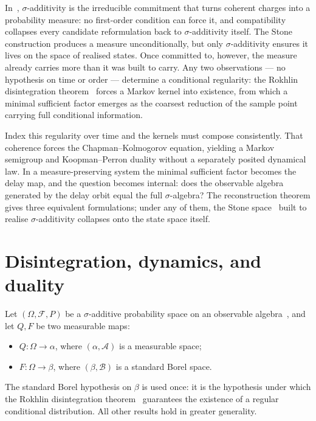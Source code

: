 In~\cite{mahon_paper1}, $\sigma$-additivity is the irreducible commitment
that turns coherent charges into a probability measure: no first-order
condition can force it, and compatibility collapses every candidate
reformulation back to $\sigma$-additivity itself.  The Stone construction
produces a measure unconditionally, but only $\sigma$-additivity ensures it
lives on the space of realised states.  Once committed to, however, the
measure already carries more than it was built to carry.  Any two
observations --- no hypothesis on time or order --- determine a
conditional regularity: the Rokhlin disintegration
theorem~\cite{Rokhlin1952} forces a Markov kernel into existence,
from which a minimal sufficient factor emerges as the coarsest
reduction of the sample point carrying full conditional information.

Index this regularity over time and the kernels must compose
consistently.  That coherence forces the Chapman--Kolmogorov
equation, yielding a Markov semigroup and Koopman--Perron duality
without a separately posited dynamical law.  In a measure-preserving
system the minimal sufficient factor becomes the delay map, and the
question becomes internal: does the observable algebra generated by
the delay orbit equal the full $\sigma$-algebra?  The reconstruction
theorem gives three equivalent formulations; under any of them, the
Stone space~\cite{mahon_paper1} built to realise $\sigma$-additivity
collapses onto the state space itself.

\section{Disintegration, dynamics, and duality}
\label{II:sec:prediction}


Let $(\Omega, \mathcal{F}, P)$ be a $\sigma$-additive probability space on an
observable algebra~\cite{mahon_paper1}, and let $Q, F$ be two measurable maps:
\begin{itemize}
  \item $Q : \Omega \to \alpha$, where $(\alpha, \mathcal{A})$ is a measurable space;
  \item $F : \Omega \to \beta$, where $(\beta, \mathcal{B})$ is a standard Borel space.
\end{itemize}
The standard Borel hypothesis on $\beta$ is used once: it is the hypothesis under
which the Rokhlin disintegration theorem~\cite{Rokhlin1952} guarantees the existence
of a regular conditional distribution.  All other results hold in greater generality.

